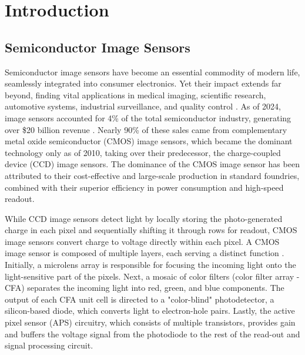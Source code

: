 \chapter{Introduction}\label{ch:introduction}

\section{Semiconductor Image Sensors}

Semiconductor image sensors have become an essential commodity of modern life, seamlessly integrated into consumer electronics. Yet their impact extends far beyond, finding vital applications in medical imaging, scientific research, automotive systems, industrial surveillance, and quality control \cite{Shi2023ApplicationsInnovations}. As of 2024, image sensors accounted for 4\% of the total semiconductor industry, generating over \$20 billion revenue \cite{Domengie2024TheApplications}. Nearly 90\% of these sales came from complementary metal oxide semiconductor (CMOS) image sensors, which became the dominant technology only as of 2010, taking over their predecessor, the charge-coupled device (CCD) image sensors. The dominance of the CMOS image sensor has been attributed to their cost-effective and large-scale production in standard foundries, combined with their superior efficiency in power consumption and high-speed readout\cite{Bigas2006ReviewSensors}.


While CCD image sensors detect light by locally storing the photo-generated charge in each pixel and sequentially shifting it through rows for readout, CMOS image sensors convert charge to voltage directly within each pixel. A CMOS image sensor is composed of multiple layers, each serving a distinct function \cite{ElGamal2005CMOSSensors}. Initially, a microlens array is responsible for focusing the incoming light onto the light-sensitive part of the pixels. Next, a mosaic of color filters (color filter array - CFA) separates the incoming light into red, green, and blue components. The output of each CFA unit cell is directed to a "color-blind" photodetector, a silicon-based diode, which converts light to electron-hole pairs. Lastly, the active pixel sensor (APS) circuitry, which consists of multiple transistors, provides gain and buffers the voltage signal from the photodiode to the rest of the read-out and signal processing circuit. 

